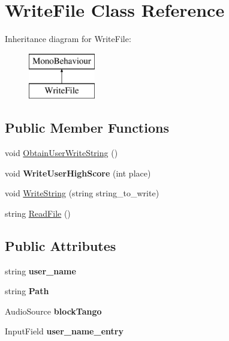 \hypertarget{class_write_file}{}\section{Write\+File Class Reference}
\label{class_write_file}
Inheritance diagram for Write\+File\+:\begin{figure}[H]
\begin{center}
\leavevmode
\includegraphics[height=2.000000cm]{class_write_file}
\end{center}
\end{figure}
\subsection*{Public Member Functions}
\begin{DoxyCompactItemize}
\item 
void \mbox{\hyperlink{class_write_file_aba1eb90785d49a55a5d626e38b00d4a4}{Obtain\+User\+Write\+String}} ()
\item 
\mbox{\label{class_write_file_a01a65f2166dccaaeb63c117544ecc7f1}} 
void {\bfseries Write\+User\+High\+Score} (int place)
\item 
void \mbox{\hyperlink{class_write_file_a1fefdb84c1e93e6fdeaf8e9a9b82f50e}{Write\+String}} (string string\+\_\+to\+\_\+write)
\item 
string \mbox{\hyperlink{class_write_file_a5912677fb1c147fb19a60d41ad438c20}{Read\+File}} ()
\end{DoxyCompactItemize}
\subsection*{Public Attributes}
\begin{DoxyCompactItemize}
\item 
\mbox{\label{class_write_file_a4d6bf45fa86917d6b68887ee8d76e8c2}} 
string {\bfseries user\+\_\+name}
\item 
\mbox{\label{class_write_file_a830552a44a771966bff295ddeacfeca7}} 
string {\bfseries Path}
\item 
\mbox{\label{class_write_file_a5c6a7e6c8c8ca0b72ed6e035a1cfe804}} 
Audio\+Source {\bfseries block\+Tango}
\item 
\mbox{\label{class_write_file_a8942dd5f5acb0f7b025c4c5af9a882e8}} 
Input\+Field {\bfseries user\+\_\+name\+\_\+entry}
\end{DoxyCompactItemize}


